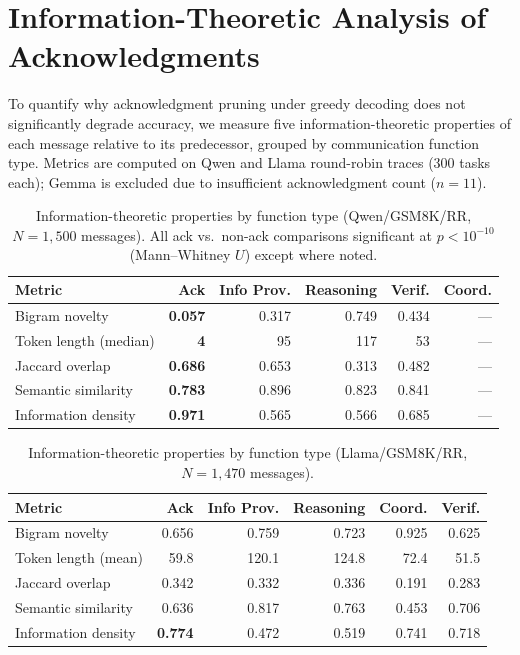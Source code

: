 \section{Information-Theoretic Analysis of Acknowledgments}
\label{app:info_theory}

To quantify why acknowledgment pruning under greedy decoding does not significantly degrade accuracy, we measure five information-theoretic properties of each message relative to its predecessor, grouped by communication function type. Metrics are computed on Qwen and Llama round-robin traces (300 tasks each); Gemma is excluded due to insufficient acknowledgment count ($n = 11$).

\begin{table}[ht]
\centering
\caption{Information-theoretic properties by function type (Qwen/GSM8K/RR, $N = 1{,}500$ messages). All ack vs.\ non-ack comparisons significant at $p < 10^{-10}$ (Mann--Whitney $U$) except where noted.}
\label{tab:info_theory_qwen}
\small
\begin{tabular}{@{}lrrrrr@{}}
\toprule
\textbf{Metric} & \textbf{Ack} & \textbf{Info Prov.} & \textbf{Reasoning} & \textbf{Verif.} & \textbf{Coord.} \\
\midrule
Bigram novelty & \textbf{0.057} & 0.317 & 0.749 & 0.434 & --- \\
Token length (median) & \textbf{4} & 95 & 117 & 53 & --- \\
Jaccard overlap & \textbf{0.686} & 0.653 & 0.313 & 0.482 & --- \\
Semantic similarity & \textbf{0.783} & 0.896 & 0.823 & 0.841 & --- \\
Information density & \textbf{0.971} & 0.565 & 0.566 & 0.685 & --- \\
\bottomrule
\end{tabular}
\end{table}

\begin{table}[ht]
\centering
\caption{Information-theoretic properties by function type (Llama/GSM8K/RR, $N = 1{,}470$ messages).}
\label{tab:info_theory_llama}
\small
\begin{tabular}{@{}lrrrrr@{}}
\toprule
\textbf{Metric} & \textbf{Ack} & \textbf{Info Prov.} & \textbf{Reasoning} & \textbf{Coord.} & \textbf{Verif.} \\
\midrule
Bigram novelty & 0.656 & 0.759 & 0.723 & 0.925 & 0.625 \\
Token length (mean) & 59.8 & 120.1 & 124.8 & 72.4 & 51.5 \\
Jaccard overlap & 0.342 & 0.332 & 0.336 & 0.191 & 0.283 \\
Semantic similarity & 0.636 & 0.817 & 0.763 & 0.453 & 0.706 \\
Information density & \textbf{0.774} & 0.472 & 0.519 & 0.741 & 0.718 \\
\bottomrule
\end{tabular}
\end{table}

